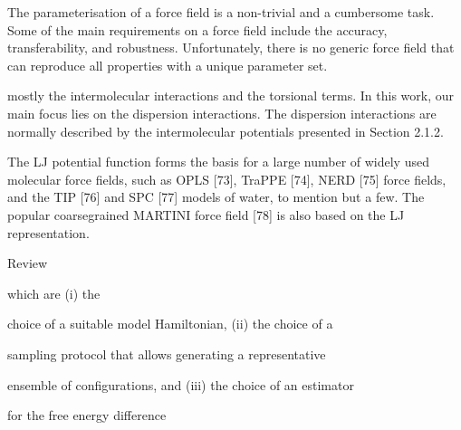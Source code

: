 The parameterisation of a force field is a non-trivial and a cumbersome task. Some of
the main requirements on a force field include the accuracy, transferability, and robustness. Unfortunately, there is no generic force field that can reproduce all properties with a
unique parameter set.



mostly the intermolecular interactions and the torsional terms. In this work, our main focus lies on the
dispersion interactions. The dispersion interactions are normally described by the intermolecular potentials presented in Section 2.1.2.

The LJ potential function forms the basis for a large number of widely
used molecular force fields, such as OPLS [73], TraPPE [74], NERD [75] force fields, and
the TIP [76] and SPC [77] models of water, to mention but a few. The popular coarsegrained MARTINI force field [78] is also based on the LJ representation.


Review

which are (i) the

choice of a suitable model Hamiltonian, (ii) the choice of a

sampling protocol that allows generating a representative

ensemble of configurations, and (iii) the choice of an estimator

for the free energy difference




